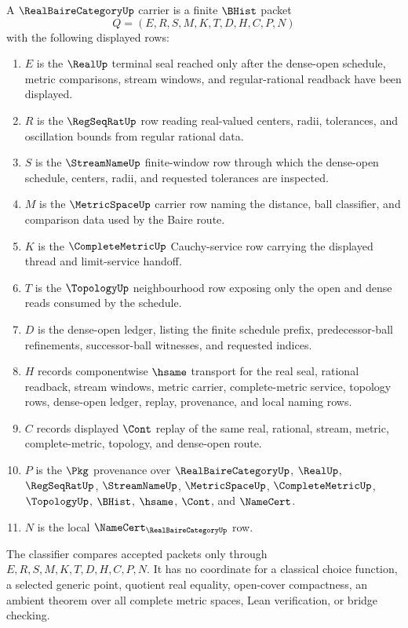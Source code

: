 \begin{definition}
\label{def:real-baire-category-carrier}
A $\RealBaireCategoryUp$ carrier is a finite $\BHist$ packet
$$
Q=(E,R,S,M,K,T,D,H,C,P,N)
$$
with the following displayed rows:
\begin{enumerate}
\item $E$ is the $\RealUp$ terminal seal reached only after the dense-open schedule, metric comparisons, stream windows, and regular-rational readback have been displayed.
\item $R$ is the $\RegSeqRatUp$ row reading real-valued centers, radii, tolerances, and oscillation bounds from regular rational data.
\item $S$ is the $\StreamNameUp$ finite-window row through which the dense-open schedule, centers, radii, and requested tolerances are inspected.
\item $M$ is the $\MetricSpaceUp$ carrier row naming the distance, ball classifier, and comparison data used by the Baire route.
\item $K$ is the $\CompleteMetricUp$ Cauchy-service row carrying the displayed thread and limit-service handoff.
\item $T$ is the $\TopologyUp$ neighbourhood row exposing only the open and dense reads consumed by the schedule.
\item $D$ is the dense-open ledger, listing the finite schedule prefix, predecessor-ball refinements, successor-ball witnesses, and requested indices.
\item $H$ records componentwise $\hsame$ transport for the real seal, rational readback, stream windows, metric carrier, complete-metric service, topology rows, dense-open ledger, replay, provenance, and local naming rows.
\item $C$ records displayed $\Cont$ replay of the same real, rational, stream, metric, complete-metric, topology, and dense-open route.
\item $P$ is the $\Pkg$ provenance over $\RealBaireCategoryUp$, $\RealUp$, $\RegSeqRatUp$, $\StreamNameUp$, $\MetricSpaceUp$, $\CompleteMetricUp$, $\TopologyUp$, $\BHist$, $\hsame$, $\Cont$, and $\NameCert$.
\item $N$ is the local $\NameCert_{\RealBaireCategoryUp}$ row.
\end{enumerate}
The classifier compares accepted packets only through $E,R,S,M,K,T,D,H,C,P,N$. It has no coordinate for a classical choice function, a selected generic point, quotient real equality, open-cover compactness, an ambient theorem over all complete metric spaces, Lean verification, or bridge checking.
\end{definition}

